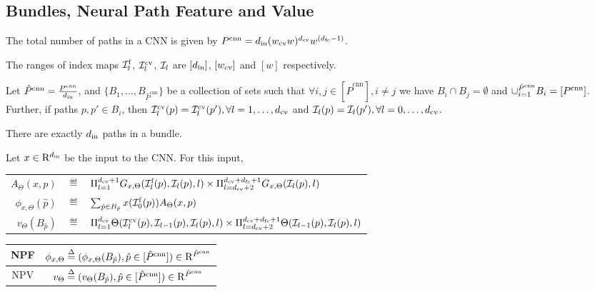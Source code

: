 \subsection{Bundles, Neural Path Feature and Value}
\begin{proposition}
The total number of paths in a CNN is given by  $P^{\text{cnn}}=d_{\text{in}}(w_{\text{cv}} w)^{d_{\text{cv}}}w^{(d_{\text{fc}}-1)}$.
\end{proposition}

\begin{notation}
The ranges of index maps $\mathcal{I}^{\text{f}}_l$,  $\mathcal{I}^{\text{cv}}_l$, $\mathcal{I}_l$ are $[d_{\text{in}}]$, $[w_{\text{cv}}]$ and $[w]$ respectively. 
\end{notation}

\begin{definition}\label{def:bundle}
Let $\hat{P}^{\text{cnn}}=\frac{P^{\text{cnn}}}{d_{\text{in}}}$, and $\{B_1,\ldots, B_{\hat{P}^{\text{cnn}}}\}$ be a collection of sets such that $\forall i,j\in [\hat{P}^{\text{cnn}}], i\neq j$ we have $B_i\cap B_j=\emptyset$ and $\cup_{i=1}^{\hat{P}^{\text{cnn}}}B_i =[P^{\text{cnn}}]$. Further,  if paths $p,p' \in B_i$, then $\mathcal{I}^{\text{cv}}_l(p)=\mathcal{I}^{\text{cv}}_l(p'), \forall l=1,\ldots, d_{\text{cv}}$ and $\mathcal{I}_l(p)=\mathcal{I}_l(p'), \forall l=0,\ldots, d_{\text{cv}}$.
\end{definition}

\begin{proposition}\label{prop:bundle}
There are exactly $d_{\text{in}}$ paths in a bundle.
\end{proposition}

\begin{definition}\label{def:nps} Let $x\in\mathrm{R}^{d_{\text{in}}}$ be the input to the CNN. For this input, 
\begin{tabular}{rlp{4cm}}
$A_{\Theta}(x,p)$&$\eqdef$&$\Pi_{l=1}^{d_{\text{cv}}+1} G_{x,\Theta}(\mathcal{I}^{\text{f}}_l(p),\mathcal{I}_l(p),l)\times\Pi_{l=d_{\text{cv}}+2}^{d_{\text{cv}}+d_{\text{fc}}+1} G_{x,\Theta}(\mathcal{I}_l(p),l)$\\
$\phi_{x,\Theta}(\hat{p})$&$\eqdef$&$ \sum_{\hat{p}\in B_{\hat{p}}}x(\mathcal{I}^{\text{f}}_0(p))A_{\Theta}(x,p)$\\
$v_{\Theta}(B_{\hat{p}})$&$\eqdef$&$ \Pi_{l=1}^{d_{\text{cv}}} \Theta(\mathcal{I}^{\text{cv}}_{l}(p),\mathcal{I}_{l-1}(p),\mathcal{I}_{l}(p),l) \times \Pi_{l=d_{\text{cv}}+2}^{d_{\text{cv}}+d_{\text{fc}}+1} \Theta(\mathcal{I}_{l-1}(p),\mathcal{I}_l(p),l)$ 
\end{tabular}
\begin{center}
\begin{tabular}{|c|c|}\hline
NPF &$\phi_{x,\Theta}\stackrel{\Delta}{=} (\phi_{x,\Theta}(B_{\hat{p}}),\hat{p}\in [\hat{P}^{\text{cnn}}])\in\mathrm{R}^{\hat{P}^{\text{cnn}}}$\\\hline
NPV& $v_{\Theta}\stackrel{\Delta}{=} (v_{\Theta}(B_{\hat{p}}),\hat{p}\in [\hat{P}^{\text{cnn}}])\in\mathrm{R}^{\hat{P}^{\text{cnn}}}$\\\hline
\end{tabular}
\end{center}
\end{definition}

